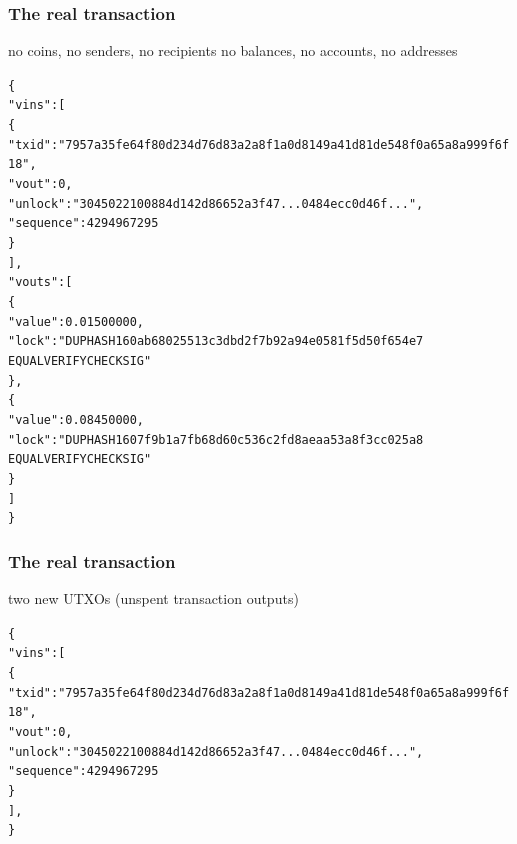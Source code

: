 \documentclass[11pt]{beamer}  %
\begin{document}
\begin{frame}[fragile]\frametitle{The real transaction}

  \begin{center}
    no coins, no senders, no recipients no balances, no accounts, no addresses
  \end{center}

  {\scriptsize\begin{alltt}
\{
  "vins": [
    \{
      "txid": "7957a35fe64f80d234d76d83a2a8f1a0d8149a41d81de548f0a65a8a999f6f18",
      "vout": 0,
      "unlock": "3045022100884d142d86652a3f47... 0484ecc0d46f...",
      "sequence": 4294967295
    \}
  ],
  "vouts": [
    \{
      "value": 0.01500000,
      "lock": "DUP HASH160 ab68025513c3dbd2f7b92a94e0581f5d50f654e7 
               EQUALVERIFY CHECKSIG"
    \},
    \{
      "value": 0.08450000,
      "lock": "DUP HASH160 7f9b1a7fb68d60c536c2fd8aeaa53a8f3cc025a8
               EQUALVERIFY CHECKSIG"
    \}
  ]
\}
\end{alltt}}

\end{frame}

\begin{frame}[fragile]\frametitle{The real transaction}

  \begin{center}
    two new UTXOs (unspent transaction outputs)
  \end{center}

  {\scriptsize\begin{alltt}
\{
  "vins": [
    \{
      "txid": "7957a35fe64f80d234d76d83a2a8f1a0d8149a41d81de548f0a65a8a999f6f18",
      "vout": 0,
      "unlock": "3045022100884d142d86652a3f47... 0484ecc0d46f...",
      "sequence": 4294967295
    \}
  ],
\}
\end{alltt}}

\end{frame}
\end{document}

